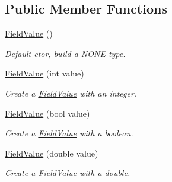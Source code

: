 \subsection*{Public Member Functions}
\begin{DoxyCompactItemize}
\item 
\mbox{\label{classZiApi_1_1FieldValue_af642f53e1c7bb6d78db1d52cb601c315}} 
\mbox{\hyperlink{classZiApi_1_1FieldValue_af642f53e1c7bb6d78db1d52cb601c315}{Field\+Value}} ()
\begin{DoxyCompactList}\small\item\em Default ctor, build a N\+O\+NE type. \end{DoxyCompactList}\item 
\mbox{\label{classZiApi_1_1FieldValue_a278890459a854cd3ef4c7637c259b597}} 
\mbox{\hyperlink{classZiApi_1_1FieldValue_a278890459a854cd3ef4c7637c259b597}{Field\+Value}} (int value)
\begin{DoxyCompactList}\small\item\em Create a \mbox{\hyperlink{classZiApi_1_1FieldValue}{Field\+Value}} with an integer. \end{DoxyCompactList}\item 
\mbox{\label{classZiApi_1_1FieldValue_a47fce7bf08038e701e6b9ecf937d96b6}} 
\mbox{\hyperlink{classZiApi_1_1FieldValue_a47fce7bf08038e701e6b9ecf937d96b6}{Field\+Value}} (bool value)
\begin{DoxyCompactList}\small\item\em Create a \mbox{\hyperlink{classZiApi_1_1FieldValue}{Field\+Value}} with a boolean. \end{DoxyCompactList}\item 
\mbox{\label{classZiApi_1_1FieldValue_ac7c40d57848a5470d1275d17ee24b3dd}} 
\mbox{\hyperlink{classZiApi_1_1FieldValue_ac7c40d57848a5470d1275d17ee24b3dd}{Field\+Value}} (double value)
\begin{DoxyCompactList}\small\item\em Create a \mbox{\hyperlink{classZiApi_1_1FieldValue}{Field\+Value}} with a double. \end{DoxyCompactList}\item 
\mbox{\label{classZiApi_1_1FieldValue_ae33f2795f9a16adb872815faf9cea5c5}} 

\end{DoxyCompactItemize}
